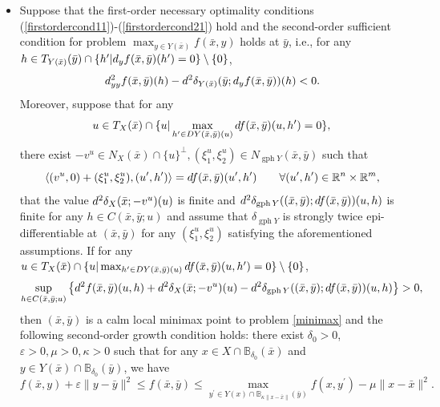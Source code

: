 \documentclass[10pt,a4paper]{amsart}
\begin{document}
\begin{theorem}
\begin{itemize}
\item[(b)] Suppose that the first-order necessary optimality conditions (\ref{firstordercond11})-(\ref{firstordercond21})  hold and the second-order sufficient condition for  problem $\max_{y\in Y(\bar x)} f(\bar x, y)$ holds at $\bar y$, i.e., for any $h\in T_{ Y(\bar x)}(\bar y) \cap \{h'|{\rm d}_y f(\bar x,\bar y)(h') =  0\} \setminus \{0\}$,
\begin{equation}\label{sufflower}
{\rm d}^2_{yy} f(\bar x,\bar y)(h) -{\rm d}^2 \delta_{Y(\bar x)}(\bar y;{\rm d}_yf(\bar x,\bar y))(h)<0.
\end{equation}
Moreover, suppose  that for any $$u\in  T_{ X}(\bar x) \cap \{u|\max_{h'\in DY(\bar x,\bar y)(u)}{\rm d} f(\bar x,\bar y)(u,h') =  0\},$$ there exist $-v^u\in N_X(\bar x)\cap \{u\}^\perp, (\xi_1^u,\xi_2^u) \in N_{\operatorname{gph}Y}(\bar x,\bar y)$ such that  $$\langle (v^u,0)+(\xi_1^u,\xi_2^u), (u',h') \rangle = {\rm d} f(\bar x,\bar y)(u',h') \qquad \forall (u',h') \in \mathbb{R}^n \times \mathbb{R}^m,$$  that the value ${\rm d}^2 \delta_X(\bar x;-v^u)(u)$ is finite and ${\rm d}^2 \delta_{\operatorname{gph}Y}((\bar x,\bar y);{\rm d}f(\bar x,\bar y))(u,h)$ is finite for any $h \in C(\bar x,\bar y;u)$ and  assume that \( \delta_{\operatorname{gph} Y} \) is strongly twice epi-differentiable at \( (\bar{x}, \bar{y}) \) for any  \( (\xi_1^u, \xi_2^u) \) satisfying the aforementioned assumptions.
If for any $u\in  T_{ X}(\bar x) \cap \{u|\max_{h'\in DY(\bar x,\bar y)(u)}{\rm d} f(\bar x,\bar y)(u,h') =  0\} \setminus \{0\}$, 
\begin{equation}\label{cxlower3-non-new1}
\sup_{h \in C(\bar x,\bar y;u)}  \left\{ {\rm d}^2 f(\bar x,\bar y)(u,h) + {\rm d}^2 \delta_X(\bar x;-v^u)(u) -{\rm d}^2 \delta_{\operatorname{gph}Y}((\bar x,\bar y);{\rm d}f(\bar x,\bar y))(u,h) \right\} >0,
\end{equation}
then $(\bar x,\bar y)$ is a calm local minimax point to problem \eqref{minimax} and  the  following second-order growth condition holds: there exist $\delta_0>0$,   $\varepsilon>0, \mu > 0, \kappa>0$
 such that  for any $x \in X \cap \mathbb{B}_{\delta_0}(\bar x)$ and $y \in Y(\bar x)\cap \mathbb{B}_{\delta_0}(\bar y)$, we have
\begin{equation*}
f(\bar x, y)+\varepsilon\|y-\bar y\|^2  \leq f(\bar x, \bar y) \leq  \max _{y^{\prime}  \in  Y(x)\cap \mathbb{B}_{\kappa\|x-\bar x\|}(\bar y)} f(x, y^{\prime}) - \mu \|x-\bar x\|^2.
\end{equation*}
\end{itemize}
\end{theorem}
\end{document}
